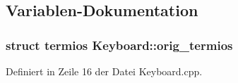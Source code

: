 \subsection{Variablen-\/Dokumentation}
\hypertarget{namespace_keyboard_a8b623d5192e406c97c4e265dbe4c5f38}{
\subsubsection[{orig\_\-termios}]{\setlength{\rightskip}{0pt plus 5cm}struct termios {\bf Keyboard::orig\_\-termios}}}
\label{namespace_keyboard_a8b623d5192e406c97c4e265dbe4c5f38}


Definiert in Zeile 16 der Datei Keyboard.cpp.

